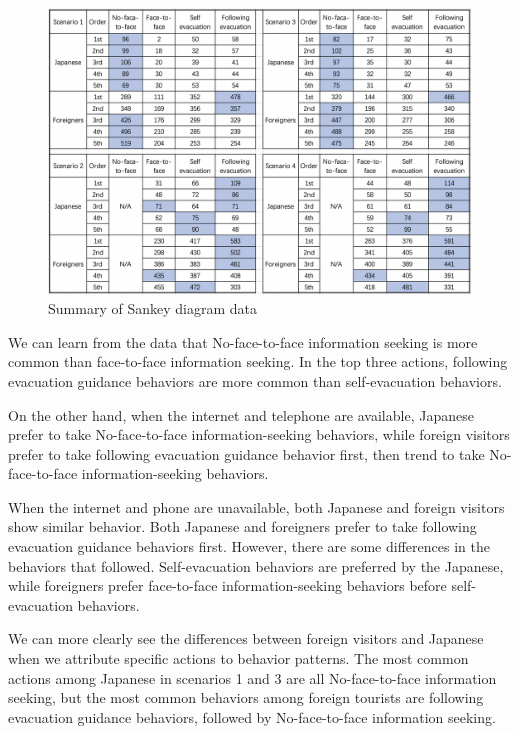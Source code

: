 \begin{figure}[h]
  \includegraphics[width=\linewidth]{Figure/Figure28.jpg}
  \centering
  \caption{Summary of Sankey diagram data}
  \label{fig28}
\end{figure}

We can learn from the data that No-face-to-face information seeking is more common than face-to-face information seeking. In the top three actions, following evacuation guidance behaviors are more common than self-evacuation behaviors. 

On the other hand, when the internet and telephone are available, Japanese prefer to take No-face-to-face information-seeking behaviors, while foreign visitors prefer to take following evacuation guidance behavior first, then trend to take No-face-to-face information-seeking behaviors. 

When the internet and phone are unavailable, both Japanese and foreign visitors show similar behavior. Both Japanese and foreigners prefer to take following evacuation guidance behaviors first. However, there are some differences in the behaviors that followed. Self-evacuation behaviors are preferred by the Japanese, while foreigners prefer face-to-face information-seeking behaviors before self-evacuation behaviors.

We can more clearly see the differences between foreign visitors and Japanese when we attribute specific actions to behavior patterns. The most common actions among Japanese in scenarios 1 and 3 are all No-face-to-face information seeking, but the most common behaviors among foreign tourists are following evacuation guidance behaviors, followed by No-face-to-face information seeking. 

